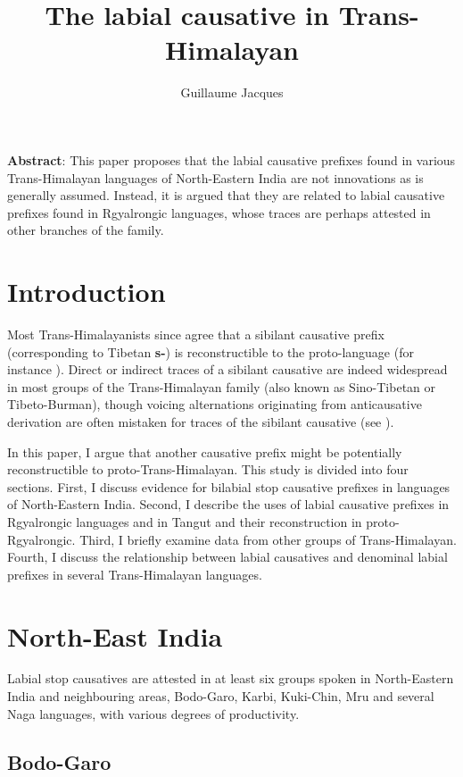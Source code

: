\documentclass[oneside,a4paper,11pt]{article}
\newcommand{\ipa}[1]{\textbf{{\phon\mbox{#1}}}} %
\begin{document}
\title{The labial causative in Trans-Himalayan}
\author{Guillaume Jacques}
\maketitle
\sloppy
\textbf{Abstract}: This paper proposes that the labial causative prefixes found in various Trans-Himalayan languages of North-Eastern India are not innovations as is generally assumed. Instead, it is argued that they are related to labial causative prefixes found in Rgyalrongic languages, whose traces are perhaps attested in other branches of the family.

\section{Introduction}
Most Trans-Himalayanists since \citet{conrady1896} agree that a sibilant causative prefix (corresponding to Tibetan \ipa{s-}) is reconstructible to the proto-language (for instance \citealt{wolfenden29outlines, matisoff03}). Direct or indirect traces of a sibilant causative are indeed widespread in most groups of the Trans-Himalayan family (also known as Sino-Tibetan or Tibeto-Burman), though voicing alternations originating from anticausative derivation are often mistaken for traces of the sibilant causative (see \citealt{jacques15causative}).

In this paper, I argue that another causative prefix might be potentially reconstructible to proto-Trans-Himalayan. This study is divided into four sections. First,  I discuss evidence for bilabial stop causative prefixes in languages of North-Eastern India. Second, I describe the uses of labial causative prefixes in Rgyalrongic languages and in Tangut and their reconstruction in proto-Rgyalrongic. Third, I briefly examine data from other groups of Trans-Himalayan. Fourth, I discuss the relationship between labial causatives and denominal labial prefixes in several Trans-Himalayan languages.

\section{North-East India}
Labial stop causatives are attested in at least six groups spoken in North-Eastern India and neighbouring areas, Bodo-Garo, Karbi, Kuki-Chin, Mru and several Naga languages, with various degrees of productivity.

\subsection{Bodo-Garo}
\end{document}
